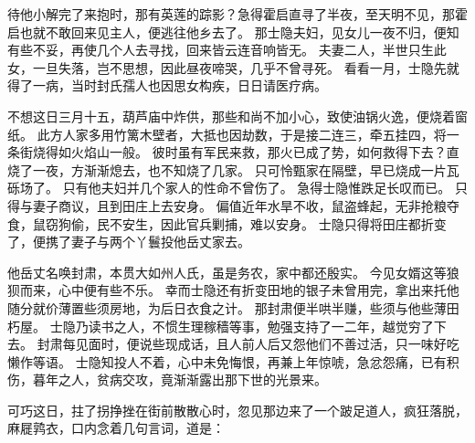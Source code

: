 待他小解完了来抱时，那有英莲的踪影？急得霍启直寻了半夜，至天明不见，那霍启也就不敢回来见主人，便逃往他乡去了。
那士隐夫妇，见女儿一夜不归，便知有些不妥，再使几个人去寻找，回来皆云连音响皆无。
夫妻二人，半世只生此女，一旦失落，岂不思想，因此昼夜啼哭，几乎不曾寻死。
看看一月，士隐先就得了一病，当时封氏孺人也因思女构疾，日日请医疗病。
\par
 不想这日三月十五，葫芦庙中炸供，那些和尚不加小心，致使油锅火逸，便烧着窗纸。
此方人家多用竹篱木壁者，大抵也因劫数，于是接二连三，牵五挂四，将一条街烧得如火焰山一般。
彼时虽有军民来救，那火已成了势，如何救得下去？直烧了一夜，方渐渐熄去，也不知烧了几家。
只可怜甄家在隔壁，早已烧成一片瓦砾场了。
只有他夫妇并几个家人的性命不曾伤了。
急得士隐惟跌足长叹而已。
只得与妻子商议，且到田庄上去安身。
偏值近年水旱不收，鼠盗蜂起，无非抢粮夺食，鼠窃狗偷，民不安生，因此官兵剿捕，难以安身。
士隐只得将田庄都折变了，便携了妻子与两个丫鬟投他岳丈家去。
\par
他岳丈名唤封肃，本贯大如州人氏，虽是务农，家中都还殷实。
今见女婿这等狼狈而来，心中便有些不乐。
幸而士隐还有折变田地的银子未曾用完，拿出来托他随分就价薄置些须房地，为后日衣食之计。
那封肃便半哄半赚，些须与他些薄田朽屋。
士隐乃读书之人，不惯生理稼穑等事，勉强支持了一二年，越觉穷了下去。
封肃每见面时，便说些现成话，且人前人后又怨他们不善过活，只一味好吃懒作等语。
士隐知投人不着，心中未免悔恨，再兼上年惊唬，急忿怨痛，已有积伤，暮年之人，贫病交攻，竟渐渐露出那下世的光景来。
\par
 可巧这日，拄了拐挣挫在街前散散心时，忽见那边来了一个跛足道人，疯狂落脱，麻屣鹑衣，口内念着几句言词，道是：\par
